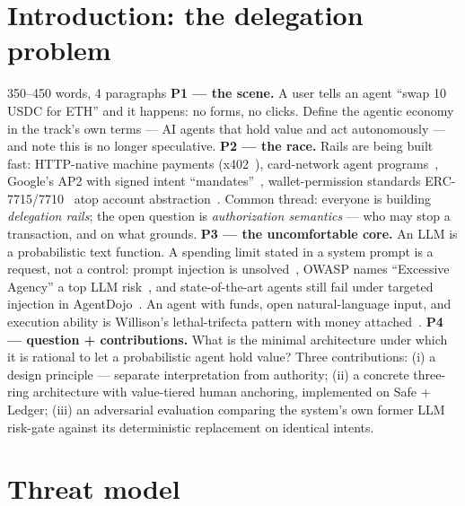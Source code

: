 \documentclass[11pt,a4paper]{article}
\begin{document}
\clearpage

\section{Introduction: the delegation problem}

\begin{towrite}{350--450 words, 4 paragraphs}
\textbf{P1 — the scene.} A user tells an agent ``swap 10 USDC for ETH'' and it
happens: no forms, no clicks. Define the agentic economy in the track's own
terms — AI agents that hold value and act autonomously — and note this is no
longer speculative.
\textbf{P2 — the race.} Rails are being built fast: HTTP-native machine payments
(x402~\cite{coinbase2025x402}), card-network agent programs~\cite{visa2025,mastercard2025},
Google's AP2 with signed intent ``mandates''~\cite{google2025ap2}, wallet-permission
standards ERC-7715/7710~\cite{erc7715,erc7710} atop account
abstraction~\cite{eip4337}. Common thread: everyone is building \emph{delegation
rails}; the open question is \emph{authorization semantics} — who may stop a
transaction, and on what grounds.
\textbf{P3 — the uncomfortable core.} An LLM is a probabilistic text function.
A spending limit stated in a system prompt is a request, not a control: prompt
injection is unsolved~\cite{greshake2023,liu2023promptinjection}, OWASP names
``Excessive Agency'' a top LLM risk~\cite{owasp2025}, and state-of-the-art
agents still fail under targeted injection in AgentDojo~\cite{debenedetti2024agentdojo}.
An agent with funds, open natural-language input, and execution ability is
Willison's lethal-trifecta pattern with money attached~\cite{willison2025}.
\textbf{P4 — question + contributions.} What is the minimal architecture under
which it is rational to let a probabilistic agent hold value? Three
contributions: (i) a design principle — separate interpretation from authority;
(ii) a concrete three-ring architecture with value-tiered human anchoring,
implemented on Safe + Ledger; (iii) an adversarial evaluation comparing the
system's own former LLM risk-gate against its deterministic replacement on
identical intents.
\end{towrite}

\section{Threat model}
\end{document}
